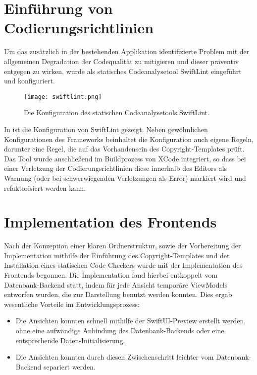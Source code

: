 \section{Einführung von Codierungsrichtlinien}

Um das zusätzlich in der bestehenden Applikation identifizierte Problem mit der allgemeinen Degradation der Codequalität zu mitigieren und dieser präventiv entgegen zu wirken, wurde als statisches Codeanalysetool SwiftLint eingeführt und konfiguriert.

\begin{figure}[H]
\texttt{[image: swiftlint.png]}
\caption{Die Konfiguration des statischen Codeanalysetools SwiftLint.}\label{fig:swiftlint}
\end{figure}

In  ist die Konfiguration von SwiftLint gezeigt. Neben gewöhnlichen Konfigurationen des Frameworks beinhaltet die Konfiguration auch eigene Regeln, darunter eine Regel, die auf das Vorhandensein des Copyright-Templates prüft. Das Tool wurde anschließend im Buildprozess von XCode integriert, so dass bei einer Verletzung der Codierungsrichtlinien diese innerhalb des Editors als Warnung (oder bei schwerwiegenden Verletzungen als Error) markiert wird und refaktorisiert werden kann.

\section{Implementation des Frontends}

Nach der Konzeption einer klaren Ordnerstruktur, sowie der Vorbereitung der Implementation mithilfe der Einführung des Copyright-Templates und der Installation eines statischen Code-Checkers wurde mit der Implementation des Frontends begonnen. Die Implementation fand hierbei entkoppelt vom Datenbank-Backend statt, indem für jede Ansicht temporäre ViewModels entworfen wurden, die zur Darstellung benutzt werden konnten. Dies ergab wesentliche Vorteile im Entwicklungsprozess:

\begin{itemize}
\item Die Ansichten konnten schnell mithilfe der SwiftUI-Preview erstellt werden, ohne eine aufwändige Anbindung des Datenbank-Backends oder eine entsprechende Daten-Initialisierung.
\item Die Ansichten konnten durch diesen Zwischenschritt leichter vom Datenbank-Backend separiert werden.
\end{itemize}

